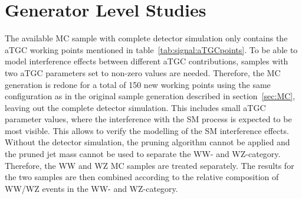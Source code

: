 \section{Generator Level Studies}
The available MC sample with complete detector simulation only contains the aTGC working points mentioned in table~\ref{tab:signal:aTGCpoints}. To be able to model interference effects between different aTGC contributions, samples with two aTGC parameters set to non-zero values are needed. Therefore, the MC generation is redone for a total of 150 new working points using the same configuration as in the original sample generation described in section~\ref{sec:MC}, leaving out the complete detector simulation. This includes small aTGC parameter values, where the interference with the SM process is expected to be most visible. This allows to verify the modelling of the SM interference effects.\\

\noindent Without the detector simulation, the pruning algorithm cannot be applied and the pruned jet mass cannot be used to separate the WW- and WZ-category. Therefore, the WW and WZ MC samples are treated separately. The results for the two samples are then combined according to the relative composition of WW/WZ events in the WW- and WZ-category.  
